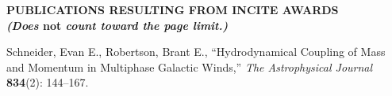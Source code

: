 \documentclass[11pt,letterpaper,english]{article}
\begin{document}
\setlength{\parindent}{0in} %


\pagestyle{fancy}   \renewcommand{%
\headrulewidth}{0.0pt}

\begin{center}
\bf {PUBLICATIONS RESULTING FROM INCITE AWARDS} \\
{\bf {\em (Does} not {\em count toward the page limit.)}}
\end{center}
\vspace{-.25in}



\leftskip 0.25in
\parindent -0.25in
{Schneider, Evan E., Robertson, Brant E., ``Hydrodynamical Coupling of Mass and Momentum in Multiphase Galactic Winds,'' {\em{The Astrophysical Journal}} {\bf{834}}(2): 144--167.}\\
\end{document}
